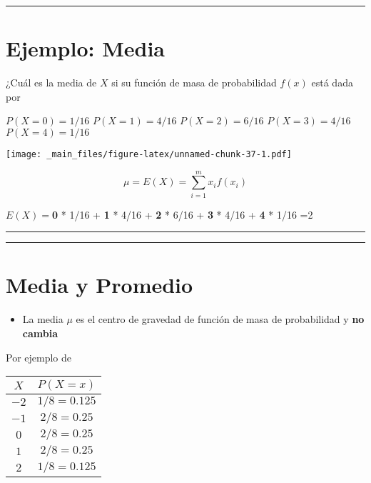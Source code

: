 \documentclass[
]{book}
\providecommand{\tightlist}{%
  \setlength{\itemsep}{0pt}\setlength{\parskip}{0pt}}
\begin{document}
\begin{center}\rule{0.5\linewidth}{0.5pt}\end{center}

\hypertarget{ejemplo-media}{%
\section{Ejemplo: Media}\label{ejemplo-media}}

¿Cuál es la media de \(X\) si su función de masa de probabilidad \(f(x)\) está dada por

\(P(X=0)=1/16\)
\(P(X=1)=4/16\)
\(P(X=2)=6/16\)
\(P(X=3)=4/16\)
\(P(X=4)=1/16\)

\texttt{[image: \_main\_files/figure-latex/unnamed-chunk-37-1.pdf]}

\[\mu =E(X)=\sum_{i=1}^m x_i f(x_i)\]

\(E(X)=\)\textbf{0} * 1/16 + \textbf{1} * 4/16 + \textbf{2} * 6/16 + \textbf{3} * 4/16 + \textbf{4} * 1/16 =2

\begin{center}\rule{0.5\linewidth}{0.5pt}\end{center}

\begin{center}\rule{0.5\linewidth}{0.5pt}\end{center}

\hypertarget{media-y-promedio}{%
\section{Media y Promedio}\label{media-y-promedio}}

\begin{itemize}
\tightlist
\item
  La media \(\mu\) es el centro de gravedad de función de masa de probabilidad y \textbf{no cambia}
\end{itemize}

Por ejemplo de

\begin{longtable}[]{@{}cc@{}}
\toprule
\(X\) & \(P(X=x)\) \\
\midrule
\endhead
\(-2\) & \(1/8=0.125\) \\
\(-1\) & \(2/8=0.25\) \\
\(0\) & \(2/8=0.25\) \\
\(1\) & \(2/8=0.25\) \\
\(2\) & \(1/8=0.125\) \\
\bottomrule
\end{longtable}
\end{document}
